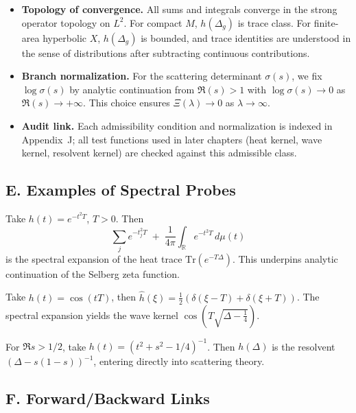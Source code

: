 \begin{itemize}
  \item \textbf{Topology of convergence.} All sums and integrals converge in the strong operator topology on $L^2$.
        For compact $M$, $h(\Delta_g)$ is trace class. For finite-area hyperbolic $X$, $h(\Delta_g)$ is bounded, and trace identities
        are understood in the sense of distributions after subtracting continuous contributions.
  \item \textbf{Branch normalization.} For the scattering determinant $\sigma(s)$, we fix $\log\sigma(s)$ by analytic continuation
        from $\Re(s)>1$ with $\log\sigma(s)\to0$ as $\Re(s)\to+\infty$. This choice ensures $\Xi(\lambda)\to 0$ as $\lambda\to\infty$.
  \item \textbf{Audit link.} Each admissibility condition and normalization is indexed in Appendix~J; all test functions used in later chapters
        (heat kernel, wave kernel, resolvent kernel) are checked against this admissible class.
\end{itemize}

\subsection*{E. Examples of Spectral Probes}
\label{subsec:examples-probes}

\begin{example}
Take $h(t)=e^{-t^2T}$, $T>0$. Then
\[
   \sum_j e^{-t_j^2T} \;+\; \frac{1}{4\pi}\int_{\mathbb{R}} e^{-t^2T}\,d\mu(t)
\]
is the spectral expansion of the heat trace $\mathrm{Tr}(e^{-T\Delta})$.
This underpins analytic continuation of the Selberg zeta function.
\end{example}

\begin{example}
Take $h(t)=\cos(tT)$, then $\hat h(\xi)=\tfrac12(\delta(\xi-T)+\delta(\xi+T))$.
The spectral expansion yields the wave kernel $\cos(T\sqrt{\Delta-\tfrac14})$.
\end{example}

\begin{example}
For $\Re s>1/2$, take $h(t)=(t^2+s^2-1/4)^{-1}$.
Then $h(\Delta)$ is the resolvent $(\Delta-s(1-s))^{-1}$,
entering directly into scattering theory.
\end{example}

\subsection*{F. Forward/Backward Links}
\label{subsec:links-test}

